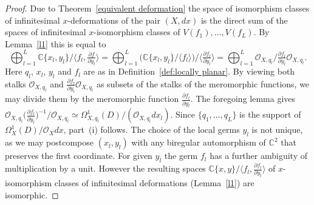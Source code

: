 \documentclass[11pt,twoside]{amsart}
\theoremstyle{plain}
\newcommand{\Sh}[1]{\mathcal{#1}} %
\newcommand{\dfx}{dx}
\begin{document}
\begin{proof}
Due to Theorem~\ref{equivalent deformation} the space of isomorphism classes of infinitesimal $x$-deformations of the pair $(X,\dfx)$ is the direct sum of the spaces of infinitesimal $x$-isomorphism classes of $V(f_1),\dots,V(f_L)$. By Lemma~\ref{l1} this is equal to
$$\bigoplus_{l=1}^L\mathbb{C}\{x_l,y_l\}/\langle f_l,\tfrac{\partial f}{\partial y_l}\rangle=\bigoplus_{l=1}^L\big(\mathbb{C}\{x_l,y_l\}/\langle f_l\rangle\big)/\langle\tfrac{\partial f_l}{\partial y_l}\rangle=\bigoplus_{l=1}^L\Sh{O}_{X,q_l}/\tfrac{\partial f_l}{\partial y_l}\Sh{O}_{X,q_l}.$$
Here $q_l$, $x_l$, $y_l$ and $f_l$ are as in Definition~\ref{def:locally planar}. By viewing both stalks $\Sh{O}_{X,q_l}$ and $\tfrac{\partial f_l}{\partial y_l}\Sh{O}_{X,q_l}$ as subsets of the stalks of the meromorphic functions, we may divide them by the meromorphic function $\frac{\partial f_l}{\partial y_l}$. The foregoing lemma gives $\Sh{O}_{X,q_l}\big(\tfrac{\partial f_l}{\partial y_l}\big)^{-1}\big/\Sh{O}_{X,q_l}\simeq\Omega^1_{X,q_l}(D)/(\Sh{O}_{X,q_l}dx_l)$. Since $\{q_1,\ldots,q_L\}$ is the support of $\Omega^1_X(D)/\Sh{O}_Xdx$, part~(i) follows. The choice of the local germs $y_l $ is not unique, as we may postcompose $(x_l,y_l)$ with any biregular automorphism of $\mathbb{C}^2$ that preserves the first coordinate. For given $y_l$ the germ $f_l$ has a further ambiguity of multiplication by a unit. However the resulting spaces $\mathbb{C}\{x,y\}\big/\langle f_l,\tfrac{\partial f_l}{\partial y_l}\rangle $ of $ x $-isomorphism classes of infinitesimal deformations (Lemma~\ref{l1}) are isomorphic.


\end{proof}
\end{document}
